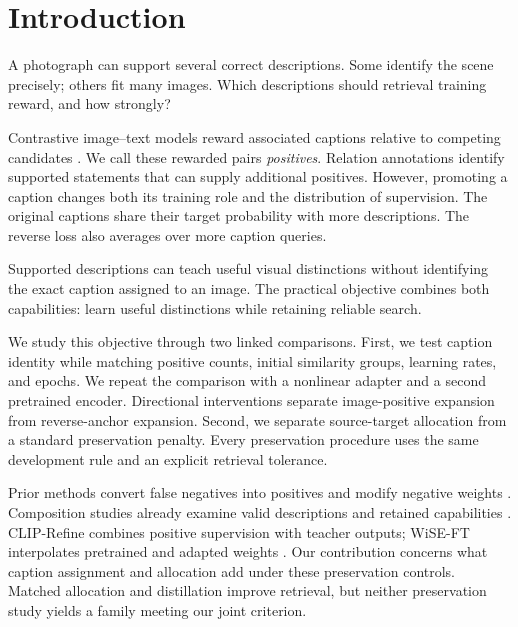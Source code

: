 \section{Introduction}
A photograph can support several correct descriptions.
Some identify the scene precisely; others fit many images.
Which descriptions should retrieval training reward, and how strongly?

Contrastive image--text models reward associated captions relative to competing candidates \citep{radford2021clip}.
We call these rewarded pairs \emph{positives}.
Relation annotations identify supported statements that can supply additional positives.
However, promoting a caption changes both its training role and the distribution of supervision.
The original captions share their target probability with more descriptions.
The reverse loss also averages over more caption queries.

Supported descriptions can teach useful visual distinctions without identifying the exact caption assigned to an image.
The practical objective combines both capabilities: learn useful distinctions while retaining reliable search.

We study this objective through two linked comparisons.
First, we test caption identity while matching positive counts, initial similarity groups, learning rates, and epochs.
We repeat the comparison with a nonlinear adapter and a second pretrained encoder.
Directional interventions separate image-positive expansion from reverse-anchor expansion.
Second, we separate source-target allocation from a standard preservation penalty.
Every preservation procedure uses the same development rule and an explicit retrieval tolerance.

Prior methods convert false negatives into positives and modify negative weights \citep{byun2024mafa,jiang2023regulation}.
Composition studies already examine valid descriptions and retained capabilities \citep{kamath2024hardpositive,oh2024fsc,peleg2025clic}.
CLIP-Refine combines positive supervision with teacher outputs; WiSE-FT interpolates pretrained and adapted weights \citep{yamaguchi2025refine,wortsman2022wise}.
Our contribution concerns what caption assignment and allocation add under these preservation controls.
Matched allocation and distillation improve retrieval, but neither preservation study yields a family meeting our joint criterion.
